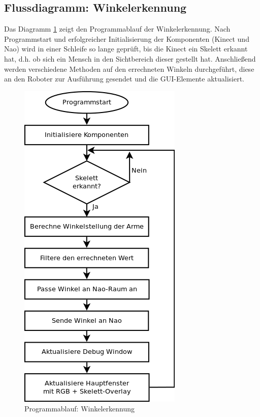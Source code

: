 \subsection{Flussdiagramm: Winkelerkennung}
Das Diagramm \ref{f:pap} zeigt den Programmablauf der Winkelerkennung. Nach Programmstart und erfolgreicher Initialisierung der Komponenten (Kinect und Nao) wird in einer Schleife so lange geprüft, bis die Kinect ein Skelett erkannt hat, d.h. ob sich ein Mensch in den Sichtbereich dieser gestellt hat. Anschließend werden verschiedene Methoden auf den errechneten Winkeln durchgeführt, diese an den Roboter zur Ausführung gesendet und die GUI-Elemente aktualisiert.  
	\begin{figure}[H]						
		\centering							
		\includegraphics[scale=0.8]{Bilder/Flussdiagramm.png}			
		\caption{Programmablauf: Winkelerkennung}						
		\label{f:pap}						
	\end{figure}
